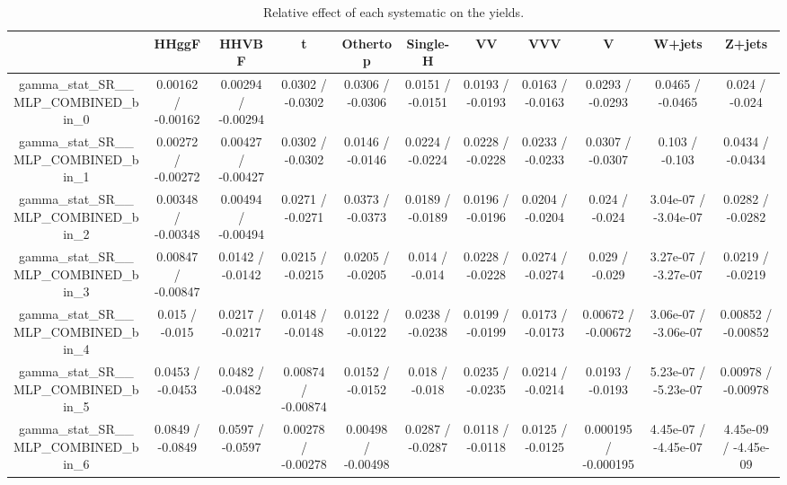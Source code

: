 \documentclass[10pt]{article}
\begin{document}
\begin{table}[htbp]
\begin{center}
\begin{tabular}{|c|c|c|c|c|c|c|c|c|c|c|}
\hline 
      & HHggF      & HHVBF      & t      & Othertop      & Single-H      & VV      & VVV      & V      & W+jets      & Z+jets \\ 
\hline 
  gamma_stat_SR__MLP_COMBINED_bin_0 & 0.00162 / -0.00162 & 0.00294 / -0.00294 & 0.0302 / -0.0302 & 0.0306 / -0.0306 & 0.0151 / -0.0151 & 0.0193 / -0.0193 & 0.0163 / -0.0163 & 0.0293 / -0.0293 & 0.0465 / -0.0465 & 0.024 / -0.024 \\ 
  gamma_stat_SR__MLP_COMBINED_bin_1 & 0.00272 / -0.00272 & 0.00427 / -0.00427 & 0.0302 / -0.0302 & 0.0146 / -0.0146 & 0.0224 / -0.0224 & 0.0228 / -0.0228 & 0.0233 / -0.0233 & 0.0307 / -0.0307 & 0.103 / -0.103 & 0.0434 / -0.0434 \\ 
  gamma_stat_SR__MLP_COMBINED_bin_2 & 0.00348 / -0.00348 & 0.00494 / -0.00494 & 0.0271 / -0.0271 & 0.0373 / -0.0373 & 0.0189 / -0.0189 & 0.0196 / -0.0196 & 0.0204 / -0.0204 & 0.024 / -0.024 & 3.04e-07 / -3.04e-07 & 0.0282 / -0.0282 \\ 
  gamma_stat_SR__MLP_COMBINED_bin_3 & 0.00847 / -0.00847 & 0.0142 / -0.0142 & 0.0215 / -0.0215 & 0.0205 / -0.0205 & 0.014 / -0.014 & 0.0228 / -0.0228 & 0.0274 / -0.0274 & 0.029 / -0.029 & 3.27e-07 / -3.27e-07 & 0.0219 / -0.0219 \\ 
  gamma_stat_SR__MLP_COMBINED_bin_4 & 0.015 / -0.015 & 0.0217 / -0.0217 & 0.0148 / -0.0148 & 0.0122 / -0.0122 & 0.0238 / -0.0238 & 0.0199 / -0.0199 & 0.0173 / -0.0173 & 0.00672 / -0.00672 & 3.06e-07 / -3.06e-07 & 0.00852 / -0.00852 \\ 
  gamma_stat_SR__MLP_COMBINED_bin_5 & 0.0453 / -0.0453 & 0.0482 / -0.0482 & 0.00874 / -0.00874 & 0.0152 / -0.0152 & 0.018 / -0.018 & 0.0235 / -0.0235 & 0.0214 / -0.0214 & 0.0193 / -0.0193 & 5.23e-07 / -5.23e-07 & 0.00978 / -0.00978 \\ 
  gamma_stat_SR__MLP_COMBINED_bin_6 & 0.0849 / -0.0849 & 0.0597 / -0.0597 & 0.00278 / -0.00278 & 0.00498 / -0.00498 & 0.0287 / -0.0287 & 0.0118 / -0.0118 & 0.0125 / -0.0125 & 0.000195 / -0.000195 & 4.45e-07 / -4.45e-07 & 4.45e-09 / -4.45e-09 \\ 
\hline 
\end{tabular} 
\caption{Relative effect of each systematic on the yields.} 
\end{center} 
\end{table} 
\end{document}
